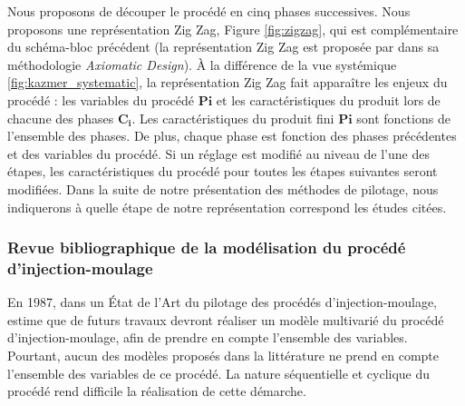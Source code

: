 Nous proposons de découper le procédé en cinq phases successives. Nous proposons une représentation Zig Zag, Figure \ref{fig:zigzag}, qui est complémentaire du schéma-bloc précédent (la représentation Zig Zag est proposée par \cite{suh_principles_1990} dans sa méthodologie \textit{Axiomatic Design}).
À la différence de la vue systémique \ref{fig:kazmer_systematic}, la représentation Zig Zag fait apparaître les enjeux du procédé : les variables du procédé $\boldsymbol{Pi}$ et les caractéristiques du produit lors de chacune des phases $\boldsymbol{C_i}$.
Les caractéristiques du produit fini $\boldsymbol{Pi}$ sont fonctions de l’ensemble des phases.
De plus, chaque phase est fonction des phases précédentes et des variables du procédé.
Si un réglage est modifié au niveau de l’une des étapes, les caractéristiques du procédé pour toutes les étapes suivantes seront modifiées.
Dans la suite de notre présentation des méthodes de pilotage, nous indiquerons à quelle étape de notre représentation correspond les études citées.

\subsubsection{Revue bibliographique de la modélisation du procédé d'injection-moulage}
En 1987, dans un État de l’Art du pilotage des procédés d’injection-moulage, \cite{agrawal_injection-molding_1987} estime que de futurs travaux devront réaliser un modèle multivarié du procédé d'injection-moulage, afin de prendre en compte l’ensemble des variables.
Pourtant, aucun des modèles proposés dans la littérature ne prend en compte l'ensemble des variables de ce procédé.
La nature séquentielle et cyclique du procédé rend difficile la réalisation de cette démarche.

